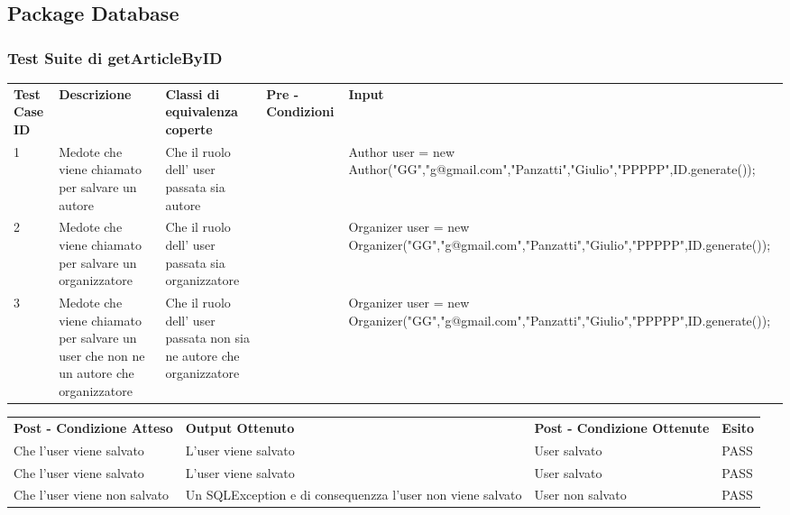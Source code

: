 \subsection{Package Database}
\label{sec:test_funzionale_package_database}

\subsubsection{Test Suite di getArticleByID}
\begin{tabular}{|p{2.5cm}|p{2.5cm}|p{3cm}|p{1.5cm}|p{5cm}|}
\hline
\rowcolor{SkyBlue}
\multicolumn{5}{l}{\textbf{p1}}\\
\hline
\rowcolor{Red}
\textbf{Test Case ID} & \textbf{Descrizione} & \textbf{Classi di equivalenza coperte} & \textbf{Pre - Condizioni} & \textbf{Input} \\
\hline
1&Medote che viene chiamato per salvare un autore&Che il ruolo dell' user passata sia autore&&Author user = new Author("GG","g@gmail.com","Panzatti","Giulio","PPPPP",ID.generate());\\
\hline
2&Medote che viene chiamato per salvare un organizzatore&Che il ruolo dell' user passata sia organizzatore&&Organizer user = new Organizer("GG","g@gmail.com","Panzatti","Giulio","PPPPP",ID.generate());\\
\hline
3&Medote che viene chiamato per salvare un user che non ne un autore che organizzatore&Che il ruolo dell' user passata non sia ne autore che organizzatore&&Organizer user = new Organizer("GG","g@gmail.com","Panzatti","Giulio","PPPPP",ID.generate());\\
\hline
\end{tabular}


\begin{tabular}{|p{3.5cm}|p{3cm}|p{3cm}|p{1cm}|}
\hline
\rowcolor{SkyBlue}
\multicolumn{4}{l}{\textbf{p2}}\\
\hline
\rowcolor{Red}
 \textbf{Post - Condizione Atteso} & \textbf{Output Ottenuto}& \textbf{Post - Condizione Ottenute}& \textbf{Esito}\\
\hline
Che l'user viene salvato&L'user viene salvato&User salvato&PASS\\
\hline
Che l'user viene salvato&L'user viene salvato&User salvato&PASS\\
\hline
Che l'user viene non salvato& Un SQLException e di consequenzza l'user non viene salvato&User non salvato&PASS\\
\hline
\end{tabular}

